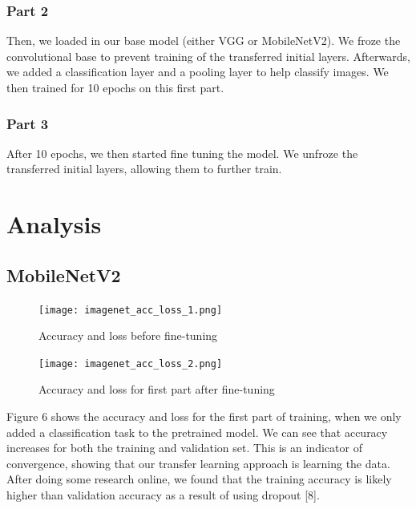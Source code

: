 \documentclass[letterpaper]{article} %
\begin{document}
\subsubsection{Part 2}
Then, we loaded in our base model (either VGG or MobileNetV2). We froze the convolutional base to prevent training of the transferred initial layers. Afterwards, we added a classification layer and a pooling layer to help classify images. We then trained for 10 epochs on this first part. 

\subsubsection{Part 3}
After 10 epochs, we then started fine tuning the model. We unfroze the transferred initial layers, allowing them to further train.

\section{Analysis}

\subsection{MobileNetV2}

\begin{figure}[h!]
    \centering
    \begin{minipage}{0.2\textwidth}
        \centering
        \texttt{[image: imagenet\_acc\_loss\_1.png]}
        \caption{Accuracy and loss before fine-tuning}
        \label{fig:fig1}
    \end{minipage}
    \hfill
    \begin{minipage}{0.2\textwidth}
        \centering
        \texttt{[image: imagenet\_acc\_loss\_2.png]}
        \caption{Accuracy and loss for first part after fine-tuning}
        \label{fig:fig2}
    \end{minipage}
\end{figure}


Figure 6 shows the accuracy and loss for the first part of training, when we only added a classification task to the pretrained model. We can see that accuracy increases for both the training and validation set. This is an indicator of convergence, showing that our transfer learning approach is learning the data. After doing some research online, we found that the training accuracy is likely higher than validation accuracy as a result of using dropout [8].
\end{document}
